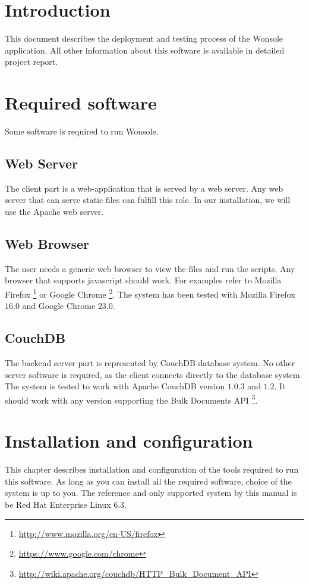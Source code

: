 \section{Introduction}
This document describes the deployment and testing process of the Wonsole application.
All other information about this software is available in detailed project
report.
\section{Required software}
Some software is required to run Wonsole. 
\subsection{Web Server}
The client part is a web-application that is served by a web server. Any web
server that can serve static files can fulfill this role. In our installation,
we will use the Apache web server.

\subsection{Web Browser}
The user needs a generic web browser to view the files and run the scripts. Any
browser that supports javascript should work. For examples refer to Mozilla
Firefox \footnote{\url{http://www.mozilla.org/en-US/firefox}} or Google Chrome
\footnote{\url{https://www.google.com/chrome}}. The system has been tested with
Mozilla Firefox $16.0$ and Google Chrome $23.0$. 

\subsection{CouchDB}
The backend server part is represented by CouchDB database system. No other
server software is required, as the client connects directly to the database system.
The system is tested to work with Apache CouchDB version $1.0.3$ and $1.2$. It
should work with any version supporting the Bulk Documents API
\footnote{\url{http://wiki.apache.org/couchdb/HTTP_Bulk_Document_API}}.





\section{Installation and configuration}
This chapter describes installation and configuration of the tools required to
run this software. As long as you can install all the required software,
choice of the system is up to you. The reference and only supported system by
this manual is be Red Hat Enterprise Linux 6.3.

